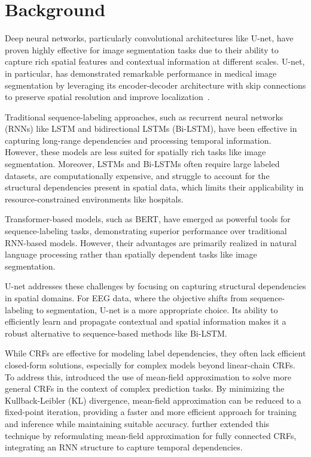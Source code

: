 \documentclass[conference]{IEEEtran}
\begin{document}
\section{Background}


Deep neural networks, particularly convolutional architectures like U-net, have 
proven highly effective for image segmentation tasks due to their ability to
capture rich spatial features and contextual information at different scales.
U-net, in particular, has demonstrated remarkable performance in medical image
segmentation by leveraging its encoder-decoder architecture with skip
connections to preserve spatial resolution and improve
localization~\citep{ronneberger2015unet,zhou2018unet}.


Traditional sequence-labeling approaches, such as recurrent neural networks
(RNNs) like LSTM and bidirectional LSTMs (Bi-LSTM), have been effective in
capturing long-range dependencies and processing temporal information. However,
these models are less suited for spatially rich tasks like image segmentation.
Moreover, LSTMs and Bi-LSTMs often require large labeled datasets, are
computationally expensive, and struggle to account for the structural
dependencies present in spatial data, which limits their applicability in
resource-constrained environments like hospitals.


Transformer-based models, such as BERT, have emerged as powerful tools for
sequence-labeling tasks, demonstrating superior performance over traditional
RNN-based models. However, their advantages are primarily realized in natural
language processing rather than spatially dependent tasks like image
segmentation.


U-net addresses these challenges by focusing on capturing structural
dependencies in spatial domains. For EEG data, where the objective shifts from
sequence-labeling to segmentation, U-net is a more appropriate choice. Its
ability to efficiently learn and propagate contextual and spatial information
makes it a robust alternative to sequence-based methods like Bi-LSTM.


While CRFs are effective for modeling label dependencies, they often lack
efficient closed-form solutions, especially for complex models beyond
linear-chain CRFs. To address this, \citet{krahenbuhl2011efficient} introduced
the use of mean-field approximation to solve more general CRFs in the context
of complex prediction tasks. By minimizing the Kullback-Leibler (KL)
divergence, mean-field approximation can be reduced to a fixed-point iteration,
providing a faster and more efficient approach for training and inference
while maintaining suitable accuracy. \citet{zheng2015conditional} further
extended this technique by reformulating mean-field approximation for fully
connected CRFs, integrating an RNN structure to capture temporal dependencies.
\end{document}
